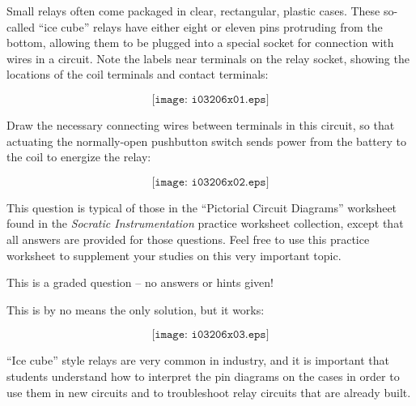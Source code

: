 

Small relays often come packaged in clear, rectangular, plastic cases.  These so-called ``ice cube'' relays have either eight or eleven pins protruding from the bottom, allowing them to be plugged into a special socket for connection with wires in a circuit.  Note the labels near terminals on the relay socket, showing the locations of the coil terminals and contact terminals:

$$\texttt{[image: i03206x01.eps]}$$

Draw the necessary connecting wires between terminals in this circuit, so that actuating the normally-open pushbutton switch sends power from the battery to the coil to energize the relay:

\vskip 20pt

$$\texttt{[image: i03206x02.eps]}$$

\vfil 

This question is typical of those in the ``Pictorial Circuit Diagrams'' worksheet found in the {\it Socratic Instrumentation} practice worksheet collection, except that all answers are provided for those questions.  Feel free to use this practice worksheet to supplement your studies on this very important topic.

\eject






This is a graded question -- no answers or hints given!
 






This is by no means the only solution, but it works:

$$\texttt{[image: i03206x03.eps]}$$

``Ice cube'' style relays are very common in industry, and it is important that students understand how to interpret the pin diagrams on the cases in order to use them in new circuits and to troubleshoot relay circuits that are already built.





